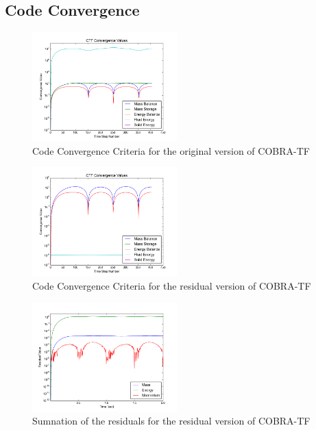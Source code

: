 \documentclass{mc2015}
\begin{document}
\subsection{Code Convergence}

\begin{figure}[!h]
	\centering
	\includegraphics[width=0.500\textwidth]{images/Code_Verification/run_00_00/original/results/Convergence_Plot}
	\caption{Code Convergence Criteria for the original version of COBRA-TF}
	\label{fig:Code_Convergance:Original}
\end{figure}

\begin{figure}[!h]
	\centering
	\includegraphics[width=0.500\textwidth]{images/Code_Verification/run_00_00/residual/results/Convergence_Plot}
	\caption{Code Convergence Criteria for the residual version of COBRA-TF}
	\label{fig:Code_Convergance:Residual}
\end{figure}

\begin{figure}[!h]
	\centering
	\includegraphics[width=0.500\textwidth]{images/Code_Verification/run_00_00/residual/results/Residuals_Plot}
	\caption{Sumnation of the residuals for the residual version of COBRA-TF}
	\label{fig:Residuals_Plot}
\end{figure}
\end{document}
